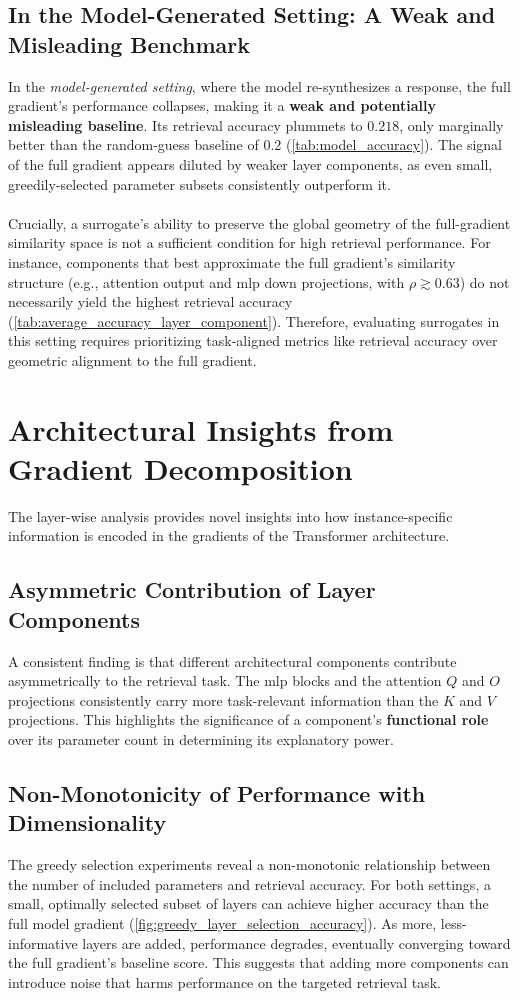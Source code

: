 \subsection{In the Model-Generated Setting: A Weak and Misleading Benchmark}
In the \emph{model-generated setting}, where the model re-synthesizes a response, the full gradient's performance collapses, making it a \textbf{weak and potentially misleading baseline}. Its retrieval accuracy plummets to $0.218$, only marginally better than the random-guess baseline of $0.2$ (\autoref{tab:model_accuracy}). The signal of the full gradient appears diluted by weaker layer components, as even small, greedily-selected parameter subsets consistently outperform it.
\\\\
Crucially, a surrogate's ability to preserve the global geometry of the full-gradient similarity space is not a sufficient condition for high retrieval performance. For instance, components that best approximate the full gradient's similarity structure (e.g., attention output and \acrshort{mlp} down projections, with $\rho \gtrsim 0.63$) do not necessarily yield the highest retrieval accuracy (\autoref{tab:average_accuracy_layer_component}). Therefore, evaluating surrogates in this setting requires prioritizing task-aligned metrics like retrieval accuracy over geometric alignment to the full gradient.

\section{Architectural Insights from Gradient Decomposition}
The layer-wise analysis provides novel insights into how instance-specific information is encoded in the gradients of the Transformer architecture.

\subsection{Asymmetric Contribution of Layer Components}
A consistent finding is that different architectural components contribute asymmetrically to the retrieval task. The \acrshort{mlp} blocks and the attention $Q$ and $O$ projections consistently carry more task-relevant information than the $K$ and $V$ projections. This highlights the significance of a component's \textbf{functional role} over its parameter count in determining its explanatory power.

\subsection{Non-Monotonicity of Performance with Dimensionality}
The greedy selection experiments reveal a non-monotonic relationship between the number of included parameters and retrieval accuracy. For both settings, a small, optimally selected subset of layers can achieve higher accuracy than the full model gradient (\autoref{fig:greedy_layer_selection_accuracy}). As more, less-informative layers are added, performance degrades, eventually converging toward the full gradient's baseline score. This suggests that adding more components can introduce noise that harms performance on the targeted retrieval task.

